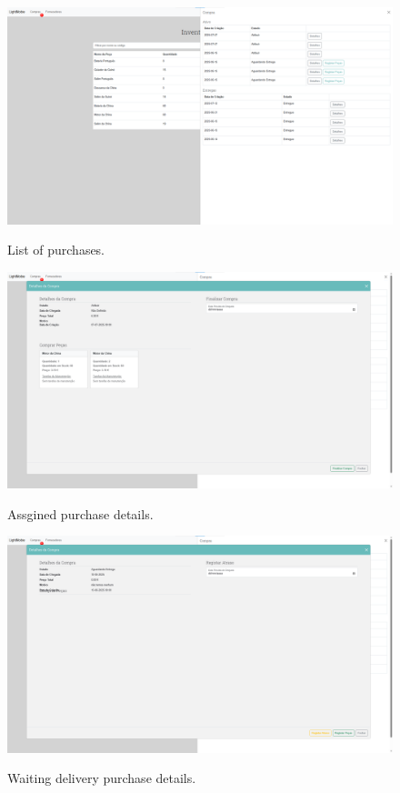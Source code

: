 \begin{figure}[h]
  \caption{List of purchases.}
  \centering
  \includegraphics[width=\textwidth]{figs/Implementation/warehouse/PurchaseList}
  \label{fig:PurchaseList}
\end{figure}


\begin{figure}[h]
  \caption{Assgined purchase details.}
  \centering
  \includegraphics[width=\textwidth]{figs/Implementation/warehouse/PurchaseDetails}
  \label{fig:PurchaseDetails}
\end{figure}


\begin{figure}[h]
  \caption{Waiting delivery purchase details.}
  \centering
  \includegraphics[width=\textwidth]{figs/Implementation/warehouse/PurchaseRegisterParts}
  \label{fig:PurchaseRegisterParts}
\end{figure}


